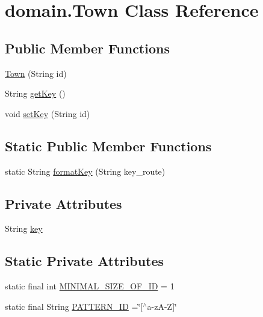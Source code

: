 \hypertarget{classdomain_1_1_town}{}\section{domain.\+Town Class Reference}
\label{classdomain_1_1_town}
\subsection*{Public Member Functions}
\begin{DoxyCompactItemize}
\item 
\hyperlink{classdomain_1_1_town_aa94ed3b3a105cf53298454563e2302a8}{Town} (String id)
\item 
String \hyperlink{classdomain_1_1_town_a4d9996c44520ba3639163348b1c1d2ca}{get\+Key} ()
\item 
void \hyperlink{classdomain_1_1_town_abc867cf10f6b9c2f7191317456071ce7}{set\+Key} (String id)
\end{DoxyCompactItemize}
\subsection*{Static Public Member Functions}
\begin{DoxyCompactItemize}
\item 
static String \hyperlink{classdomain_1_1_town_a6a88af9728067dd135eea6df9591496b}{format\+Key} (String key\+\_\+route)
\end{DoxyCompactItemize}
\subsection*{Private Attributes}
\begin{DoxyCompactItemize}
\item 
String \hyperlink{classdomain_1_1_town_a7956786ac5d60459ba43fc02938c1a8d}{key}
\end{DoxyCompactItemize}
\subsection*{Static Private Attributes}
\begin{DoxyCompactItemize}
\item 
static final int \hyperlink{classdomain_1_1_town_a254052bc77acbbe725111ac4c7e421ab}{M\+I\+N\+I\+M\+A\+L\+\_\+\+S\+I\+Z\+E\+\_\+\+O\+F\+\_\+\+ID} = 1
\item 
static final String \hyperlink{classdomain_1_1_town_a5e280191f43d4d1bf42071aa1762e069}{P\+A\+T\+T\+E\+R\+N\+\_\+\+ID} =\char`\"{}\mbox{[}$^\wedge$a-\/zA-\/Z\mbox{]}\char`\"{}
\end{DoxyCompactItemize}



